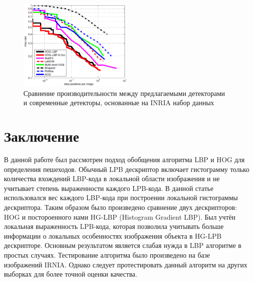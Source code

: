\documentclass[12pt,twoside]{article}
\begin{document}
\begin{figure}[H]
	\includegraphics[width=0.5\textwidth]{Wang2}
	\caption{Сравнение производительности между предлагаемыми детекторами и современные детекторы, основанные на INRIA набор данных\cite{Wang09}}
	\label{fg:HOG_Wang}
\end{figure}

\section{Заключение}
В данной работе был рассмотрен подход обобщения алгоритма LBP и HOG для определения пешеходов. Обычный LPB дескриптор включает гистограмму только количества вхождений LBP-кода в локальной области изображения и не учитывает степень выраженности каждого LPB-кода. В данной статье использовался вес каждого LBP-кода при построении локальной гистограммы дескриптора. Таким образом было произведено сравнение двух дескрипторов: HOG и постороенного нами HG-LBP (Histogram Gradient LBP). Был учтён локальная выраженность LPB-кода, которая позволила учитывать больше информации о локальных особенностях изображения объекта в HG-LPB дескрипторе. Основным результатом является слабая нужда в LBP алгоритме в простых случаях. Тестирование алгоритма было произведено на базе изображений IRNIA. Однако следует протестировать данный алгоритм на других выборках для более точной оценки качества.


\bigskip
\newpage
\maketitleSecondary




\end{document}
